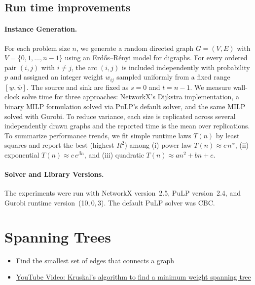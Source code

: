 \subsection{Run time improvements}

\paragraph{Instance Generation.}
For each problem size \(n\), we generate a random directed graph \(G=(V,E)\) with \(V=\{0,1,\dots,n-1\}\) using an Erd\H{o}s--R\'enyi model for digraphs. For every ordered pair \((i,j)\) with \(i\neq j\), the arc \((i,j)\) is included independently with probability \(p\) and assigned an integer weight \(w_{ij}\) sampled uniformly from a fixed range \([\underline{w},\overline{w}]\). The source and sink are fixed as \(s=0\) and \(t=n-1\). We measure wall-clock solve time for three approaches: NetworkX’s Dijkstra implementation, a binary MILP formulation solved via PuLP’s default solver, and the same MILP solved with Gurobi. To reduce variance, each size is replicated across several independently drawn graphs and the reported time is the mean over replications. To summarize performance trends, we fit simple runtime laws \(T(n)\) by least squares and report the best (highest \(R^2\)) among (i) power law \(T(n)\approx c\,n^{\alpha}\), (ii) exponential \(T(n)\approx c\,e^{\beta n}\), and (iii) quadratic \(T(n)\approx a n^2+ b n + c\).

\paragraph{Solver and Library Versions.}
The experiments were run with NetworkX version~2.5, PuLP version~2.4, and Gurobi runtime version~(10,\,0,\,3).  
The default PuLP solver was CBC.

\section{Spanning Trees}
\begin{outcome}
\begin{itemize}
\item Find the smallest set of edges that connects a graph
\end{itemize}
\end{outcome}

\begin{resource}
\begin{itemize}
\item \href{https://www.youtube.com/watch?v=SfyrD-ktYew&ab_channel=KimberlyBrehm}{YouTube Video: Kruskal's algorithm to find a minimum weight spanning tree}
\end{itemize}
\end{resource}

